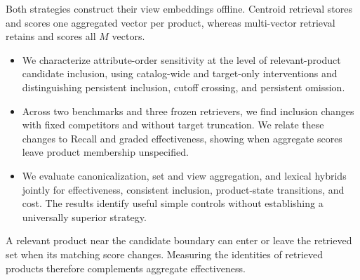 
Both strategies construct their view embeddings offline. Centroid retrieval stores and scores one aggregated vector per product, whereas multi-vector retrieval retains and scores all $M$ vectors.

\begin{itemize}
\item We characterize attribute-order sensitivity at the level of relevant-product candidate inclusion, using catalog-wide and target-only interventions and distinguishing persistent inclusion, cutoff crossing, and persistent omission.
\item Across two benchmarks and three frozen retrievers, we find inclusion changes with fixed competitors and without target truncation. We relate these changes to Recall and graded effectiveness, showing when aggregate scores leave product membership unspecified.
\item We evaluate canonicalization, set and view aggregation, and lexical hybrids jointly for effectiveness, consistent inclusion, product-state transitions, and cost. The results identify useful simple controls without establishing a universally superior strategy.
\end{itemize}

A relevant product near the candidate boundary can enter or leave the retrieved set when its matching score changes. Measuring the identities of retrieved products therefore complements aggregate effectiveness.


